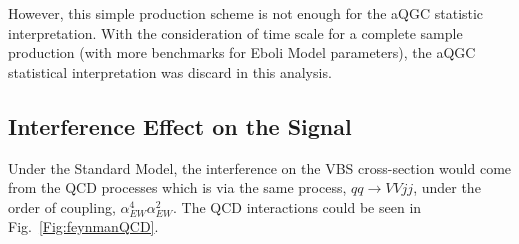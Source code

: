 \noindent
However, this simple production scheme is not enough for the aQGC statistic interpretation. With the consideration of time scale for a complete sample production (with more benchmarks for Eboli Model parameters), the aQGC statistical interpretation was discard in this analysis.
\subsection{Interference Effect on the Signal}
Under the Standard Model, the interference on the VBS cross-section would come from the QCD processes which is via the same process, $qq\to VVjj$, under the order of coupling, $\alpha_{EW}^4\alpha_{EW}^2$. The QCD interactions could be seen in Fig.~\ref{Fig:feynmanQCD}.
\begin{figure}[tbp]
	\begin{center}
		\\
\end{center}
\end{figure}

